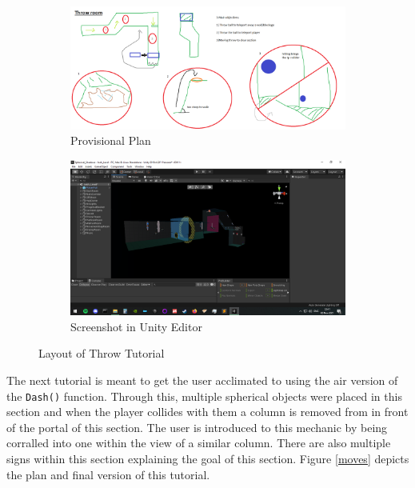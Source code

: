 \begin{figure}[H]
\centering
\begin{subfigure}{0.45\textwidth}
  \centering
  \includegraphics[width=1\linewidth]{Figures/throwplan.png}
  \caption{Provisional Plan}
\end{subfigure}%
\begin{subfigure}{0.45\textwidth}
  \centering
  \includegraphics[width=1\linewidth]{Figures/throw.png}
  \caption{Screenshot in Unity Editor}
\end{subfigure}
\caption{Layout of Throw Tutorial}
\label{throw}
\end{figure}

\noindent The next tutorial is meant to get the user acclimated to using the air version of the \texttt{Dash()} function. Through this, multiple spherical objects were placed in this section and when the player collides with them a column is removed from in front of the portal of this section. The user is introduced to this mechanic by being corralled into one within the view of a similar column. There are also multiple signs within this section explaining the goal of this section. Figure \ref{moves} depicts the plan and final version of this tutorial. 

